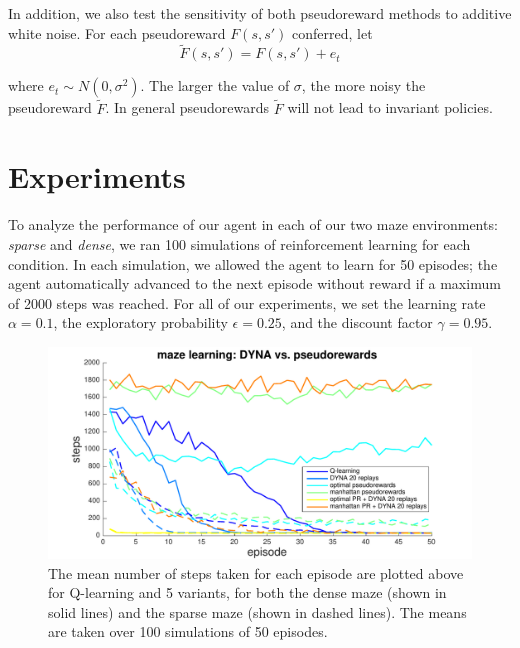 \documentclass[notitlepage]{article}
\begin{document}
In addition, we also test the sensitivity of both pseudoreward methods to additive white noise. For each pseudoreward $F(s, s')$ conferred, let
\begin{equation}
\tilde{F}(s, s') = F(s, s') + e_t
\end{equation} 

\noindent where $e_t \sim N(0, \sigma^2)$. The larger the value of $\sigma$, the more noisy the pseudoreward $\tilde{F}$. In general pseudorewards $\tilde{F}$ will not lead to invariant policies.

\section*{Experiments}

To analyze the performance of our agent in each of our two maze environments: \textit{sparse} and \textit{dense}, we ran 100 simulations of reinforcement learning for each condition. In each simulation, we allowed the agent to learn for 50 episodes; the agent automatically advanced to the next episode without reward if a maximum of 2000 steps was reached. For all of our experiments, we set the learning rate $\alpha = 0.1$, the exploratory probability $\epsilon = 0.25$, and the discount factor $\gamma = 0.95$. 

\begin{figure}[ht]
\includegraphics[width=\textwidth]{modelCompareNoNoise}
\caption{The mean number of steps taken for each episode are plotted above for Q-learning and 5 variants, for both the dense maze (shown in solid lines) and the sparse maze (shown in dashed lines). The means are taken over 100 simulations of 50 episodes.}
\label{fig:model-compare}
\end{figure}
\end{document}
